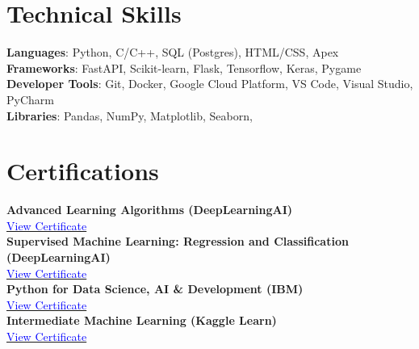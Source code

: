 \documentclass[letterpaper,11pt]{article}
\begin{document}
%
\section{Technical Skills}
 \begin{itemize}[leftmargin=0.15in, label={}]
    \small{\item{
     \textbf{Languages}{: Python, C/C++, SQL (Postgres), HTML/CSS, Apex} \\
     \textbf{Frameworks}{: FastAPI, Scikit-learn, Flask, Tensorflow, Keras, Pygame} \\
     \textbf{Developer Tools}{: Git, Docker, Google Cloud Platform, VS Code, Visual Studio, PyCharm} \\
     \textbf{Libraries}{: Pandas, NumPy, Matplotlib, Seaborn, }
    }}
 \end{itemize}



\section{Certifications}
\begin{itemize}[leftmargin=0.15in, label={}]
    \small{\item{
        \textbf{Advanced Learning Algorithms (DeepLearningAI)} \\
        \href{https://www.coursera.org/account/accomplishments/records/GMHDYK93ITDR}{\textcolor{blue}{View Certificate}} \\
        
        \textbf{Supervised Machine Learning: Regression and Classification (DeepLearningAI)} \\
        \href{https://www.coursera.org/account/accomplishments/records/G293FTEQE9C2}{\textcolor{blue}{View Certificate}} \\
        
        \textbf{Python for Data Science, AI \& Development (IBM)} \\
        \href{https://www.coursera.org/account/accomplishments/records/6NZDFEBX2EKS}{\textcolor{blue}{View Certificate}} \\
        
        \textbf{Intermediate Machine Learning (Kaggle Learn)} \\
        \href{https://www.kaggle.com/learn/certification/danyalabbas1/intermediate-machine-learning}{\textcolor{blue}{View Certificate}} \\
    }}
\end{itemize}

 


\end{document}
